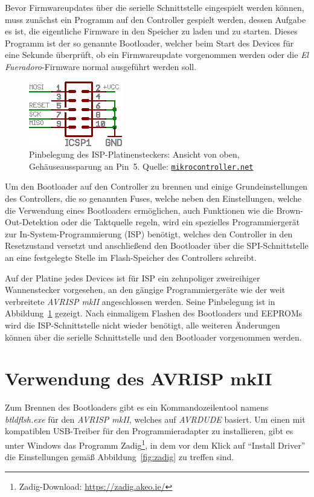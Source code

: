 \documentclass[paper=a4, parskip, numbers=noenddot, toc=listof, headsepline]{scrbook}
\newcommand{\anlage}{\emph{El Fueradoro}}
\begin{document}
		Bevor Firmwareupdates über die serielle Schnittstelle eingespielt werden können, muss zunächst ein Programm auf den Controller gespielt werden, dessen Aufgabe es ist, die eigentliche Firmware in den Speicher zu laden und zu starten. Dieses Programm ist der so genannte Bootloader, welcher beim Start des Devices für eine Sekunde überprüft, ob ein Firmwareupdate vorgenommen werden oder die {\anlage}-Firmware normal ausgeführt werden soll.

		\begin{figure}[!h]
			\centering
			\includegraphics[width=.35\textwidth]{Bilder/isp}
			\caption{Pinbelegung des ISP-Platinensteckers: Ansicht von oben, Gehäuseaussparung an Pin~5. Quelle: \href{http://www.mikrocontroller.net}{\texttt{mikrocontroller.net}}}
			\label{fig:isp}
		\end{figure}

		Um den Bootloader auf den Controller zu brennen und einige Grundeinstellungen des Controllers, die so genannten Fuses, welche neben den Einstellungen, welche die Verwendung eines Bootloaders ermöglichen, auch Funktionen wie die Brown-Out-Detektion oder die Taktquelle regeln, wird ein spezielles Programmiergerät zur In-System-Programmierung (ISP) benötigt, welches den Controller in den Resetzustand versetzt und anschließend den Bootloader über die SPI-Schnittstelle an eine festgelegte Stelle im Flash-Speicher des Controllers schreibt.

		Auf der Platine jedes Devices ist für ISP ein zehnpoliger zweireihiger Wannenstecker vorgesehen, an den gängige Programmiergeräte wie der weit verbreitete \emph{AVRISP mkII} angeschlossen werden. Seine Pinbelegung ist in Abbildung~\ref{fig:isp} gezeigt. Nach einmaligem Flashen des Bootloaders und EEPROMs wird die ISP-Schnittstelle nicht wieder benötigt, alle weiteren Änderungen können über die serielle Schnittstelle und den Bootloader vorgenommen werden.

		\section{Verwendung des AVRISP mkII}

			Zum Brennen des Bootloaders gibt es ein Kommandozeilentool namens \emph{btldflsh.exe} für den \emph{AVRISP mkII}, welches auf \emph{AVRDUDE} basiert. Um einen mit kompatiblen USB-Treiber für den Programmieradapter zu installieren, gibt es unter Windows das Programm Zadig\footnote{Zadig-Download: \url{https://zadig.akeo.ie/}}, in dem vor dem Klick auf \enquote{Install Driver} die Einstellungen gemäß Abbildung~\ref{fig:zadig} zu treffen sind.
			
\end{document}
